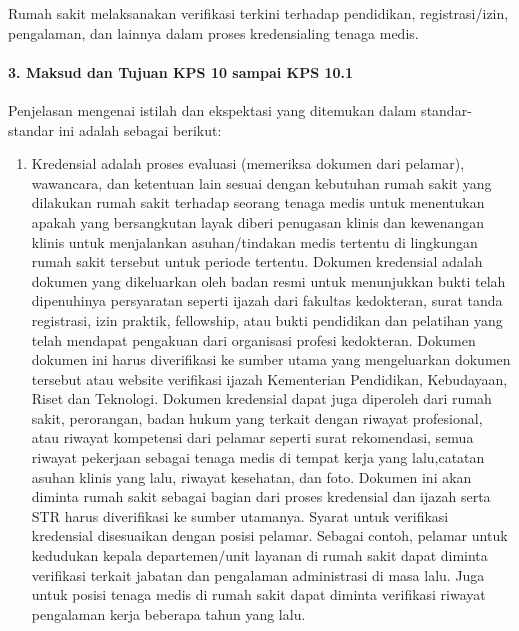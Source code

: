 \documentclass[
]{book}
\begin{document}
Rumah sakit melaksanakan verifikasi terkini terhadap pendidikan, registrasi/izin, pengalaman, dan lainnya dalam proses kredensialing tenaga medis.

\hypertarget{maksud-dan-tujuan-kps-10-sampai-kps-10.1}{%
\paragraph*{3. Maksud dan Tujuan KPS 10 sampai KPS 10.1}\label{maksud-dan-tujuan-kps-10-sampai-kps-10.1}}

Penjelasan mengenai istilah dan ekspektasi yang ditemukan dalam standar-standar ini adalah sebagai berikut:

\begin{enumerate}
\def\labelenumi{\alph{enumi}.}
\item
  Kredensial adalah proses evaluasi (memeriksa dokumen dari pelamar), wawancara, dan ketentuan lain sesuai dengan kebutuhan rumah sakit yang dilakukan rumah sakit terhadap seorang tenaga medis untuk menentukan apakah yang bersangkutan layak diberi penugasan klinis dan kewenangan klinis untuk menjalankan asuhan/tindakan medis tertentu di lingkungan rumah sakit tersebut untuk periode tertentu. Dokumen kredensial adalah dokumen yang dikeluarkan oleh badan resmi untuk menunjukkan bukti telah dipenuhinya persyaratan seperti ijazah dari fakultas kedokteran, surat tanda registrasi, izin praktik, fellowship, atau bukti pendidikan dan pelatihan yang telah mendapat pengakuan dari organisasi profesi kedokteran. Dokumen dokumen ini harus diverifikasi ke sumber utama yang mengeluarkan dokumen tersebut atau website verifikasi ijazah Kementerian Pendidikan, Kebudayaan, Riset dan Teknologi.
  Dokumen kredensial dapat juga diperoleh dari rumah sakit, perorangan, badan hukum yang terkait dengan riwayat profesional, atau riwayat kompetensi dari pelamar seperti surat rekomendasi, semua riwayat pekerjaan sebagai tenaga medis di tempat kerja yang lalu,catatan asuhan klinis yang lalu, riwayat kesehatan, dan foto. Dokumen ini akan diminta rumah sakit sebagai bagian dari proses kredensial dan ijazah serta STR harus diverifikasi ke sumber utamanya. Syarat untuk verifikasi kredensial disesuaikan dengan posisi pelamar. Sebagai contoh, pelamar untuk kedudukan kepala departemen/unit layanan di rumah sakit dapat diminta verifikasi terkait jabatan dan pengalaman administrasi di masa lalu. Juga untuk posisi tenaga medis di rumah sakit dapat diminta verifikasi riwayat pengalaman kerja beberapa tahun yang lalu.

\end{enumerate}
\end{document}
